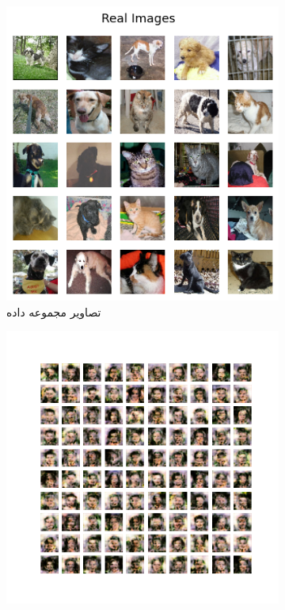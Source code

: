 \documentclass[12pt, a4paper]{book}
\begin{document}
\begin{figure}[h]
\begin{subfigure}{0.4\linewidth}
        \includegraphics[width=\linewidth]{images/cats_vs_dogs.png}
        \caption{تصاویر مجموعه داده }
    \end{subfigure}
    \newline
    \begin{subfigure}{0.4\linewidth}
        \includegraphics[width=\linewidth]{images/celeb-a_generated.png}

\end{subfigure}
\end{figure}
\end{document}
